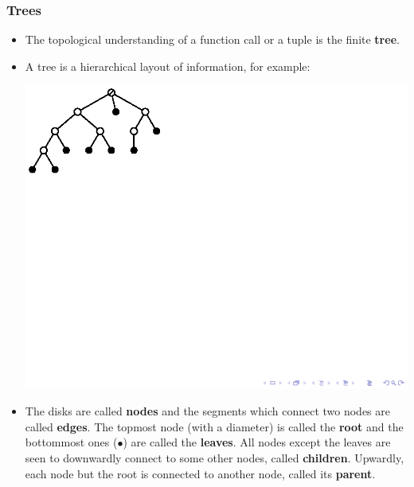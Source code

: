 \documentclass[compress,dvips,xcolor={dvipsnames},t]{beamer}
\begin{document}
\begin{frame}
  \frametitle{Trees}

  \begin{itemize}

    \item The topological understanding of a function call or a tuple
      is the finite \textbf{tree}.

    \item A tree is a hierarchical layout of information, for example:
      \begin{center}
        \includegraphics[bb=27 708 145 786]{tree_for_term}
      \end{center}

    \item The disks are called \textbf{nodes} and the segments which
      connect two nodes are called \textbf{edges}. The topmost node
      (with a diameter) is called the \textbf{root} and the bottommost
      ones (\(\bullet\)) are called the \textbf{leaves}. All nodes
      except the leaves are seen to downwardly connect to some other
      nodes, called \textbf{children}. Upwardly, each node but the
      root is connected to another node, called its \textbf{parent}.

  \end{itemize}

\end{frame}
\end{document}
